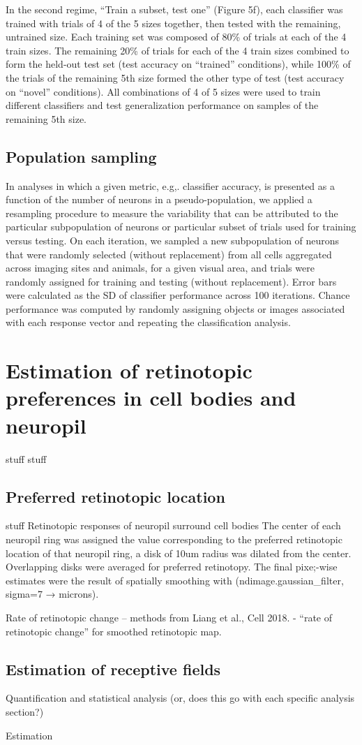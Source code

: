 In the second regime, “Train a subset, test one” (Figure 5f),  each classifier was trained with trials of  4 of the 5 sizes together, then tested with the remaining, untrained size. Each training set was composed of 80\% of trials at each of the 4 train sizes. The remaining 20\% of trials for each of the 4 train sizes combined to form the held-out test set (test accuracy on “trained” conditions), while 100\% of the trials of the remaining 5th size formed the other type of test (test accuracy on “novel” conditions). All combinations of 4 of 5 sizes were used to train different classifiers and test generalization performance on samples of the remaining 5th size.

\subsection{Population sampling}
In analyses in which a given metric, e.g,. classifier accuracy, is presented as a function of the number of neurons in a pseudo-population, we applied a resampling procedure to measure the variability that can be attributed to the particular subpopulation of neurons or particular subset of trials used for training versus testing. On each iteration, we sampled a new subpopulation of neurons that were randomly selected (without replacement) from all cells aggregated across imaging sites and animals, for a given visual area, and trials were randomly assigned for training and testing (without replacement). Error bars were calculated as the SD of classifier performance across 100 iterations. Chance performance was computed by randomly assigning objects or images associated with each response vector and repeating the classification analysis.

\section{Estimation of retinotopic preferences in cell bodies and neuropil}
stuff
stuff


\subsection{Preferred retinotopic location}
stuff
Retinotopic responses of neuropil surround cell bodies
The center of each neuropil ring was assigned the value corresponding to the preferred retinotopic location of that neuropil ring, a disk of 10um radius was dilated from the center. Overlapping disks were averaged for preferred retinotopy. The final pixe;-wise estimates were the result of spatially smoothing with (ndimage.gaussian_filter, sigma=7 → microns). 

Rate of retinotopic change -- methods from Liang et al., Cell 2018. - “rate of retinotopic change” for smoothed retinotopic map.

\subsection{Estimation of receptive fields}


Quantification and statistical analysis
(or, does this go with each specific analysis section?)

Estimation
